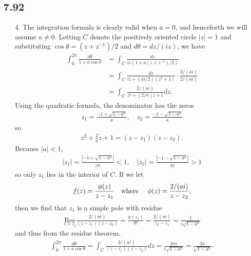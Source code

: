\documentclass[a4paper,12pt]{article}
\begin{document}
\subsection*{7.92}
\begin{enumerate}
    \item[4.]
        The integration formula is clearly valid when $a = 0$, and henceforth we will assume $a \neq 0$. Letting $C$ denote the positively oriented circle $|z| = 1$ and substituting $\cos \theta = (z + z^{-1}) / 2$ and $d\theta = dz/(iz)$, we have
        \begin{align*}
            \int_0^{2\pi} \frac{d\theta}{1 + a\cos\theta} &= \int_C \frac{dz}{iz(1 + a(z + z^{-1})/2)} \\
            &= \int_C \frac{dz}{iz + (ai/2)(z^2 + 1)} \cdot \frac{2/(ai)}{2/(ai)} \\
            &= \int_C \frac{2/(ai)}{z^2 + (2/a)z + 1} dz.
        \end{align*}
        Using the quadratic formula, the denominator has the zeros
        \begin{align*}
            z_1 = \frac{-1 + \sqrt{1 - a^2}}{a}, \quad z_2 = \frac{-1 - \sqrt{1 - a^2}}{a}
        \end{align*}
        so
        \begin{align*}
            z^2 + \frac{2}{a}z + 1 = (z - z_1)(z - z_2).
        \end{align*}
        Because $|a| < 1$,
        \begin{align*}
            |z_1| = \frac{|{-1} + \sqrt{1 - a^2}|}{|a|} < 1, \quad |z_2| = \frac{|{-1} - \sqrt{1 - a^2}|}{|a|} > 1
        \end{align*}
        so only $z_1$ lies in the interior of $C$. If we let
        \begin{align*}
            f(z) = \frac{\phi(z)}{z - z_1} \text{\quad where \quad} \phi(z) = \frac{2/(ai)}{z - z_2},
        \end{align*}
        then we find that $z_1$ is a simple pole with residue
        \begin{align*}
            \underset{z = z_1}{\text{Res}} \frac{2/(ai)}{(z - z_1)(z - z_2)} = \frac{\phi(z_1)}{0!} = \frac{2/(ai)}{z_2 - z_1} = \frac{1}{i\sqrt{1 - a^2}}
        \end{align*}
        and thus from the residue theorem,
        \begin{align*}
            \int_0^{2\pi} \frac{d\theta}{1 + a\cos\theta} = \int_C \frac{2/(ai)}{(z - z_1)(z - z_2)} dz = \frac{2\pi i}{i\sqrt{1 - a^2}} = \frac{2\pi}{\sqrt{1 - a^2}}.
        \end{align*}

\end{enumerate}
\end{document}
